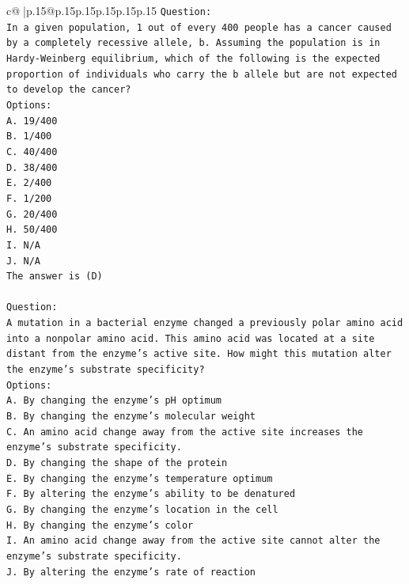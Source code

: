 \documentclass{article}
\begin{document}
{\begin{supertabular}{c@{$\;$}|p{.15\linewidth}@{}p{.15\linewidth}p{.15\linewidth}p{.15\linewidth}p{.15\linewidth}p{.15\linewidth}}
{{{\texttt{Question:} \\
\texttt{In a given population, 1 out of every 400 people has a cancer caused by a completely recessive allele, b. Assuming the population is in Hardy{-}Weinberg equilibrium, which of the following is the expected proportion of individuals who carry the b allele but are not expected to develop the cancer?} \\
\texttt{Options:} \\
\texttt{A. 19/400} \\
\texttt{B. 1/400} \\
\texttt{C. 40/400} \\
\texttt{D. 38/400} \\
\texttt{E. 2/400} \\
\texttt{F. 1/200} \\
\texttt{G. 20/400} \\
\texttt{H. 50/400} \\
\texttt{I. N/A} \\
\texttt{J. N/A} \\
\texttt{The answer is (D)} \\
\\ 
\texttt{Question:} \\
\texttt{A mutation in a bacterial enzyme changed a previously polar amino acid into a nonpolar amino acid. This amino acid was located at a site distant from the enzyme’s active site. How might this mutation alter the enzyme’s substrate specificity?} \\
\texttt{Options:} \\
\texttt{A. By changing the enzyme’s pH optimum} \\
\texttt{B. By changing the enzyme's molecular weight} \\
\texttt{C. An amino acid change away from the active site increases the enzyme's substrate specificity.} \\
\texttt{D. By changing the shape of the protein} \\
\texttt{E. By changing the enzyme's temperature optimum} \\
\texttt{F. By altering the enzyme's ability to be denatured} \\
\texttt{G. By changing the enzyme’s location in the cell} \\
\texttt{H. By changing the enzyme's color} \\
\texttt{I. An amino acid change away from the active site cannot alter the enzyme’s substrate specificity.} \\
\texttt{J. By altering the enzyme's rate of reaction} \\
}}}
\end{supertabular}}
\end{document}

